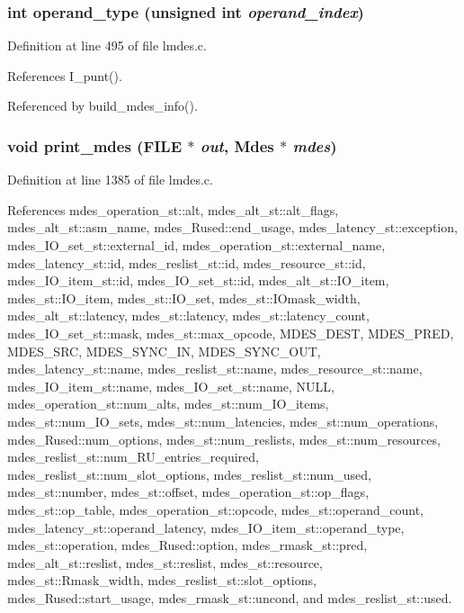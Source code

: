 \subsubsection{\setlength{\rightskip}{0pt plus 5cm}int operand\_\-type (unsigned int {\em operand\_\-index})}\label{lmdes_8h_b5521bc27b7c95d668c2641a6dfcd715}




Definition at line 495 of file lmdes.c.

References I\_\-punt().

Referenced by build\_\-mdes\_\-info().
\subsubsection{\setlength{\rightskip}{0pt plus 5cm}void print\_\-mdes (FILE $\ast$ {\em out}, \bf{Mdes} $\ast$ {\em mdes})}\label{lmdes_8h_41090f500ae1c4c9214bbbf9926b249a}




Definition at line 1385 of file lmdes.c.

References mdes\_\-operation\_\-st::alt, mdes\_\-alt\_\-st::alt\_\-flags, mdes\_\-alt\_\-st::asm\_\-name, mdes\_\-Rused::end\_\-usage, mdes\_\-latency\_\-st::exception, mdes\_\-IO\_\-set\_\-st::external\_\-id, mdes\_\-operation\_\-st::external\_\-name, mdes\_\-latency\_\-st::id, mdes\_\-reslist\_\-st::id, mdes\_\-resource\_\-st::id, mdes\_\-IO\_\-item\_\-st::id, mdes\_\-IO\_\-set\_\-st::id, mdes\_\-alt\_\-st::IO\_\-item, mdes\_\-st::IO\_\-item, mdes\_\-st::IO\_\-set, mdes\_\-st::IOmask\_\-width, mdes\_\-alt\_\-st::latency, mdes\_\-st::latency, mdes\_\-st::latency\_\-count, mdes\_\-IO\_\-set\_\-st::mask, mdes\_\-st::max\_\-opcode, MDES\_\-DEST, MDES\_\-PRED, MDES\_\-SRC, MDES\_\-SYNC\_\-IN, MDES\_\-SYNC\_\-OUT, mdes\_\-latency\_\-st::name, mdes\_\-reslist\_\-st::name, mdes\_\-resource\_\-st::name, mdes\_\-IO\_\-item\_\-st::name, mdes\_\-IO\_\-set\_\-st::name, NULL, mdes\_\-operation\_\-st::num\_\-alts, mdes\_\-st::num\_\-IO\_\-items, mdes\_\-st::num\_\-IO\_\-sets, mdes\_\-st::num\_\-latencies, mdes\_\-st::num\_\-operations, mdes\_\-Rused::num\_\-options, mdes\_\-st::num\_\-reslists, mdes\_\-st::num\_\-resources, mdes\_\-reslist\_\-st::num\_\-RU\_\-entries\_\-required, mdes\_\-reslist\_\-st::num\_\-slot\_\-options, mdes\_\-reslist\_\-st::num\_\-used, mdes\_\-st::number, mdes\_\-st::offset, mdes\_\-operation\_\-st::op\_\-flags, mdes\_\-st::op\_\-table, mdes\_\-operation\_\-st::opcode, mdes\_\-st::operand\_\-count, mdes\_\-latency\_\-st::operand\_\-latency, mdes\_\-IO\_\-item\_\-st::operand\_\-type, mdes\_\-st::operation, mdes\_\-Rused::option, mdes\_\-rmask\_\-st::pred, mdes\_\-alt\_\-st::reslist, mdes\_\-st::reslist, mdes\_\-st::resource, mdes\_\-st::Rmask\_\-width, mdes\_\-reslist\_\-st::slot\_\-options, mdes\_\-Rused::start\_\-usage, mdes\_\-rmask\_\-st::uncond, and mdes\_\-reslist\_\-st::used.

